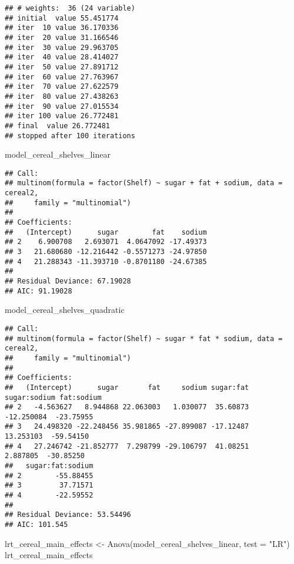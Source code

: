 \documentclass[
  11pt,
]{article}
\newenvironment{Shaded}{\begin{snugshade}}{\end{snugshade}}
\newcommand{\AttributeTok}[1]{\textcolor[rgb]{0.77,0.63,0.00}{#1}}
\newcommand{\FunctionTok}[1]{\textcolor[rgb]{0.00,0.00,0.00}{#1}}
\newcommand{\NormalTok}[1]{#1}
\newcommand{\OtherTok}[1]{\textcolor[rgb]{0.56,0.35,0.01}{#1}}
\newcommand{\StringTok}[1]{\textcolor[rgb]{0.31,0.60,0.02}{#1}}
\begin{document}
\begin{verbatim}
## # weights:  36 (24 variable)
## initial  value 55.451774 
## iter  10 value 36.170336
## iter  20 value 31.166546
## iter  30 value 29.963705
## iter  40 value 28.414027
## iter  50 value 27.891712
## iter  60 value 27.763967
## iter  70 value 27.622579
## iter  80 value 27.438263
## iter  90 value 27.015534
## iter 100 value 26.772481
## final  value 26.772481 
## stopped after 100 iterations
\end{verbatim}

\begin{Shaded}
\begin{Highlighting}[]
\NormalTok{model\_cereal\_shelves\_linear}
\end{Highlighting}
\end{Shaded}

\begin{verbatim}
## Call:
## multinom(formula = factor(Shelf) ~ sugar + fat + sodium, data = cereal2, 
##     family = "multinomial")
## 
## Coefficients:
##   (Intercept)      sugar        fat    sodium
## 2    6.900708   2.693071  4.0647092 -17.49373
## 3   21.680680 -12.216442 -0.5571273 -24.97850
## 4   21.288343 -11.393710 -0.8701180 -24.67385
## 
## Residual Deviance: 67.19028 
## AIC: 91.19028
\end{verbatim}

\begin{Shaded}
\begin{Highlighting}[]
\NormalTok{model\_cereal\_shelves\_quadratic}
\end{Highlighting}
\end{Shaded}

\begin{verbatim}
## Call:
## multinom(formula = factor(Shelf) ~ sugar * fat * sodium, data = cereal2, 
##     family = "multinomial")
## 
## Coefficients:
##   (Intercept)      sugar       fat     sodium sugar:fat sugar:sodium fat:sodium
## 2   -4.563627   8.944868 22.063003   1.030077  35.60873   -12.250084  -23.75955
## 3   24.498320 -22.248456 35.981865 -27.899087 -17.12487    13.253103  -59.54150
## 4   27.246742 -21.852777  7.298799 -29.106797  41.08251     2.887805  -30.85250
##   sugar:fat:sodium
## 2        -55.88455
## 3         37.71571
## 4        -22.59552
## 
## Residual Deviance: 53.54496 
## AIC: 101.545
\end{verbatim}

\begin{Shaded}
\begin{Highlighting}[]
\NormalTok{lrt\_cereal\_main\_effects }\OtherTok{\textless{}{-}} \FunctionTok{Anova}\NormalTok{(model\_cereal\_shelves\_linear, }\AttributeTok{test =} \StringTok{"LR"}\NormalTok{)}
\NormalTok{lrt\_cereal\_main\_effects}
\end{Highlighting}
\end{Shaded}
\end{document}
